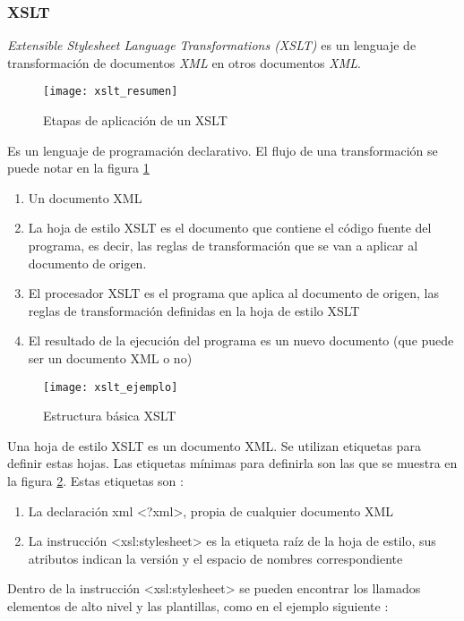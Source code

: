 \subsubsection{XSLT}
\label{MarcoConceptual:XSLT}
\emph{Extensible Stylesheet Language Transformations (XSLT)} es un lenguaje de transformación de documentos \emph{XML} en otros documentos \emph{XML}.
  \begin{figure}[h]
    \centering
    \texttt{[image: xslt\_resumen]}
    \caption{Etapas de aplicación de un XSLT}
    \label{figura:xslt_resumen}
  \end{figure}
 Es un lenguaje de programación declarativo. El flujo de una transformación se puede notar en la figura \ref{figura:xslt_resumen}
 \begin{enumerate}
        \item Un documento XML
        \item La hoja de estilo XSLT es el documento que contiene el código fuente del programa, es decir, las reglas de transformación que se van a aplicar al documento de origen.
        \item El procesador XSLT es el programa que aplica al documento de origen, las reglas de transformación definidas en la hoja de estilo XSLT
        \item El resultado de la ejecución del programa es un nuevo documento (que puede ser un documento XML o no)
        \end{enumerate}
  \begin{figure}[h]
    \centering
    \texttt{[image: xslt\_ejemplo]}
    \caption{Estructura básica XSLT}
    \label{figura:xslt_ejemplo}
  \end{figure}
Una hoja de estilo XSLT es un documento XML. Se utilizan etiquetas para definir estas hojas. Las etiquetas mínimas para definirla son las que se muestra en la figura \ref{figura:xslt_ejemplo}. Estas etiquetas son \cite{XSLT:definiciones}:
        \begin{enumerate}
        \item La declaración xml <?xml>, propia de cualquier documento XML
        \item La instrucción <xsl:stylesheet> es la etiqueta raíz de la hoja de estilo, sus atributos indican la versión y el espacio de nombres correspondiente
        \end{enumerate}
Dentro de la instrucción <xsl:stylesheet> se pueden encontrar los llamados elementos de alto nivel y las plantillas, como en el ejemplo siguiente \cite{XSLT:definiciones}:
